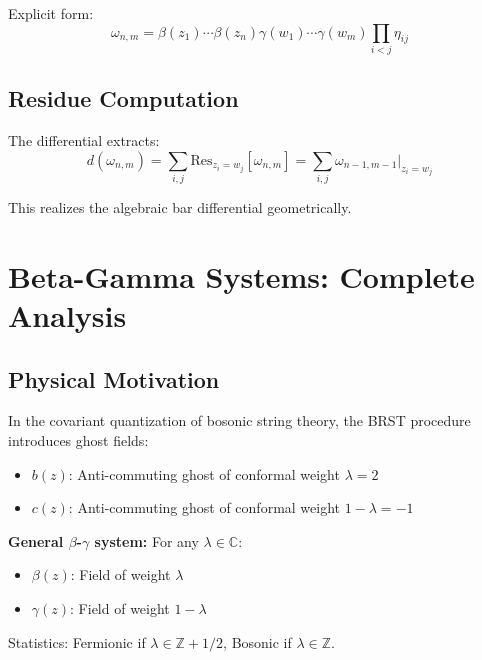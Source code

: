 Explicit form:
$$\omega_{n,m} = \beta(z_1) \cdots \beta(z_n) \gamma(w_1) \cdots \gamma(w_m) \prod_{i<j} \eta_{ij}$$

\subsection{Residue Computation}

The differential extracts:
$$d(\omega_{n,m}) = \sum_{i,j} \text{Res}_{z_i = w_j}[\omega_{n,m}] = \sum_{i,j} \omega_{n-1,m-1}|_{z_i = w_j}$$

This realizes the algebraic bar differential geometrically.


\section{Beta-Gamma Systems: Complete Analysis}
\label{sec:beta-gamma-complete-analysis}

\subsection{Physical Motivation}

\begin{motivation}
In the covariant quantization of bosonic string theory, the BRST procedure introduces 
ghost fields:
\begin{itemize}
\item $b(z)$: Anti-commuting ghost of conformal weight $\lambda = 2$
\item $c(z)$: Anti-commuting ghost of conformal weight $1-\lambda = -1$
\end{itemize}

\textbf{General $\beta$-$\gamma$ system:} For any $\lambda \in \mathbb{C}$:
\begin{itemize}
\item $\beta(z)$: Field of weight $\lambda$
\item $\gamma(z)$: Field of weight $1-\lambda$
\end{itemize}

Statistics: Fermionic if $\lambda \in \mathbb{Z} + 1/2$, Bosonic if $\lambda \in \mathbb{Z}$.
\end{motivation}

